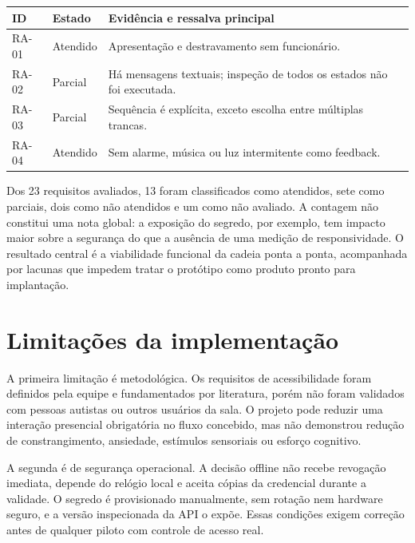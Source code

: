 \begin{quadro}[htbp]
    \caption{Resultados dos requisitos de acessibilidade}
    \label{qua:resultados-ra}
    \small
    \begin{tabular}{|p{}|p{}|p{}|}
        \hline
        \textbf{ID} & \textbf{Estado} & \textbf{Evidência e ressalva principal} \\ \hline
        RA-01 & Atendido & Apresentação e destravamento sem funcionário. \\ \hline
        RA-02 & Parcial & Há mensagens textuais; inspeção de todos os estados não foi executada. \\ \hline
        RA-03 & Parcial & Sequência é explícita, exceto escolha entre múltiplas trancas. \\ \hline
        RA-04 & Atendido & Sem alarme, música ou luz intermitente como feedback. \\ \hline
    \end{tabular}
\end{quadro}
\clearpage

Dos 23 requisitos avaliados, 13 foram classificados como atendidos, sete como parciais, dois como não atendidos e um como não avaliado. A contagem não constitui uma nota global: a exposição do segredo, por exemplo, tem impacto maior sobre a segurança do que a ausência de uma medição de responsividade. O resultado central é a viabilidade funcional da cadeia ponta a ponta, acompanhada por lacunas que impedem tratar o protótipo como produto pronto para implantação.

\section{Limitações da implementação}

A primeira limitação é metodológica. Os requisitos de acessibilidade foram definidos pela equipe e fundamentados por literatura, porém não foram validados com pessoas autistas ou outros usuários da sala. O projeto pode reduzir uma interação presencial obrigatória no fluxo concebido, mas não demonstrou redução de constrangimento, ansiedade, estímulos sensoriais ou esforço cognitivo.

A segunda é de segurança operacional. A decisão offline não recebe revogação imediata, depende do relógio local e aceita cópias da credencial durante a validade. O segredo é provisionado manualmente, sem rotação nem hardware seguro, e a versão inspecionada da API o expõe. Essas condições exigem correção antes de qualquer piloto com controle de acesso real.

